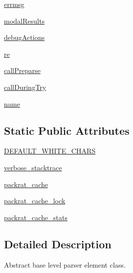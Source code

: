 \begin{DoxyCompactItemize}
\hyperlink{classsetuptools_1_1__vendor_1_1pyparsing_1_1ParserElement_a363682cec88fe079651ebe55a6327c70}{errmsg}
\item 
\hyperlink{classsetuptools_1_1__vendor_1_1pyparsing_1_1ParserElement_aa5b68797ac23ce8af810a1ca5e205dcb}{modal\+Results}
\item 
\hyperlink{classsetuptools_1_1__vendor_1_1pyparsing_1_1ParserElement_a378e1a7ff7a399dc2424f82f30353cfc}{debug\+Actions}
\item 
\hyperlink{classsetuptools_1_1__vendor_1_1pyparsing_1_1ParserElement_a002dad5e70483ad930e16f04107b2e03}{re}
\item 
\hyperlink{classsetuptools_1_1__vendor_1_1pyparsing_1_1ParserElement_af0d9d291770799bd64ae273e73a6dd69}{call\+Preparse}
\item 
\hyperlink{classsetuptools_1_1__vendor_1_1pyparsing_1_1ParserElement_a77732e30b3471b09dd78f0bbb37e15ce}{call\+During\+Try}
\item 
\hyperlink{classsetuptools_1_1__vendor_1_1pyparsing_1_1ParserElement_aeff22f349cb2211b65b16b2eadc52ee5}{name}
\end{DoxyCompactItemize}
\subsection*{Static Public Attributes}
\begin{DoxyCompactItemize}
\item 
\hyperlink{classsetuptools_1_1__vendor_1_1pyparsing_1_1ParserElement_acef29652ef829bdf3936eb7b2cdae05a}{D\+E\+F\+A\+U\+L\+T\+\_\+\+W\+H\+I\+T\+E\+\_\+\+C\+H\+A\+RS}
\item 
\hyperlink{classsetuptools_1_1__vendor_1_1pyparsing_1_1ParserElement_ae30f701c697646c8530a750c1bf16818}{verbose\+\_\+stacktrace}
\item 
\hyperlink{classsetuptools_1_1__vendor_1_1pyparsing_1_1ParserElement_abf67a1baf2ae1f81deef646e5dae2bbe}{packrat\+\_\+cache}
\item 
\hyperlink{classsetuptools_1_1__vendor_1_1pyparsing_1_1ParserElement_a757af70fb632aeb7596d1adafe3bdc06}{packrat\+\_\+cache\+\_\+lock}
\item 
\hyperlink{classsetuptools_1_1__vendor_1_1pyparsing_1_1ParserElement_a4b88fecff6ea2c78061e12391cbcc30d}{packrat\+\_\+cache\+\_\+stats}
\end{DoxyCompactItemize}


\subsection{Detailed Description}
\begin{DoxyVerb}Abstract base level parser element class.\end{DoxyVerb}
 

